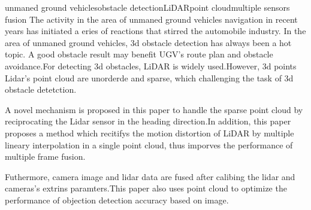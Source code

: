 
\begin{Eabstract}{unmaned ground vehicles}{obstacle detection}{LiDAR}{point cloud}{multiple sensors fusion}
The activity in the area of unmaned ground vehicles navigation in recent years has initiated a eries of reactions that stirred the automobile industry. In the area of unmaned ground vehicles, 3d obstacle detection has always been a hot topic. A good obstacle result may benefit UGV's route plan and obstacle avoidance.For detecting 3d obstacles, LiDAR is widely used.However, 3d points Lidar's point cloud are unorderde and sparse, which challenging the task of 3d obstacle detetction.

A novel mechanism is proposed in this paper to handle the sparse point cloud by reciprocating the Lidar sensor in the heading direction.In addition, this paper proposes a method which recitifys the motion distortion of LiDAR by multiple lineary interpolation in a single point cloud, thus imporves the performance of multiple frame fusion.

Futhermore, camera image and lidar data are fused after calibing the lidar and cameras's extrins paramters.This paper also uses point cloud to optimize the performance of objection detection accuracy based on image.
\end{Eabstract}

